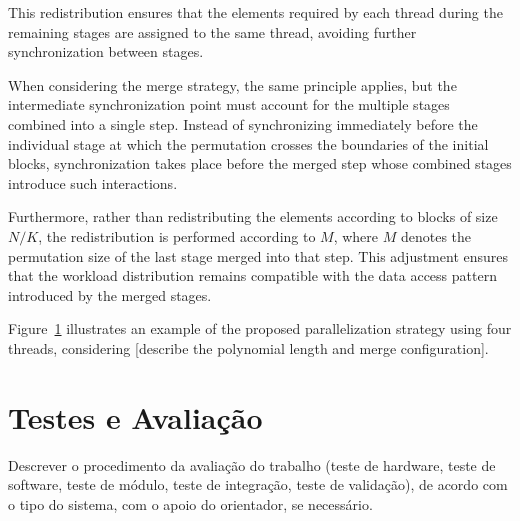 This redistribution ensures that the elements required by each thread during the remaining stages are assigned to the same thread, avoiding further synchronization between stages.

When considering the merge strategy, the same principle applies, but the intermediate synchronization point must account for the multiple stages combined into a single step. Instead of synchronizing immediately before the individual stage at which the permutation crosses the boundaries of the initial blocks, synchronization takes place before the merged step whose combined stages introduce such interactions.

Furthermore, rather than redistributing the elements according to blocks of size $N/K$, the redistribution is performed according to $M$, where $M$ denotes the permutation size of the last stage merged into that step. This adjustment ensures that the workload distribution remains compatible with the data access pattern introduced by the merged stages.

Figure~\ref{} illustrates an example of the proposed parallelization strategy using four threads, considering [describe the polynomial length and merge configuration].

\section{Testes e Avaliação}
Descrever o procedimento da avaliação do trabalho (teste de hardware, teste de software, teste de módulo, teste de integração, teste de validação), de acordo com o tipo do sistema, com o apoio do orientador, se necessário.